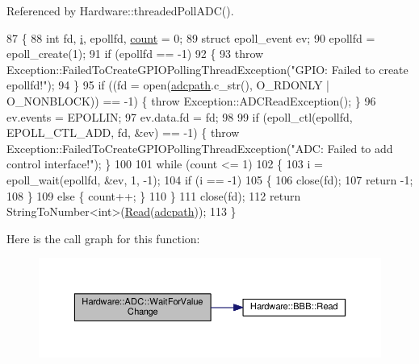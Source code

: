 Referenced by Hardware\+::threaded\+Poll\+A\+D\+C().


\begin{DoxyCode}
87     \{
88         \textcolor{keywordtype}{int} fd, \hyperlink{_comparision_pictures_2_createtest_image_8m_a6f6ccfcf58b31cb6412107d9d5281426}{i}, epollfd, \hyperlink{_comparision_pictures_2_createtest_image_8m_ae11b3deb3de3df7dc48e439074023e35}{count} = 0;
89         \textcolor{keyword}{struct }epoll\_event ev;
90         epollfd = epoll\_create(1);
91         \textcolor{keywordflow}{if} (epollfd == -1)
92         \{
93             \textcolor{keywordflow}{throw} Exception::FailedToCreateGPIOPollingThreadException(\textcolor{stringliteral}{"GPIO: Failed to create epollfd!"});
94         \}
95         \textcolor{keywordflow}{if} ((fd = open(\hyperlink{class_hardware_1_1_a_d_c_a820ce4f097a70b95246049f9ea01df21}{adcpath}.c\_str(), O\_RDONLY | O\_NONBLOCK)) == -1) \{ \textcolor{keywordflow}{throw} 
      Exception::ADCReadException();    \}
96         ev.events = EPOLLIN;
97         ev.data.fd = fd;
98 
99         \textcolor{keywordflow}{if} (epoll\_ctl(epollfd, EPOLL\_CTL\_ADD, fd, &ev) == -1) \{ \textcolor{keywordflow}{throw} 
      Exception::FailedToCreateGPIOPollingThreadException(\textcolor{stringliteral}{"ADC: Failed to add control interface!"}); \}
100 
101         \textcolor{keywordflow}{while} (count <= 1)
102         \{
103             i = epoll\_wait(epollfd, &ev, 1, -1);
104             \textcolor{keywordflow}{if} (i == -1)
105             \{
106                 close(fd);
107                 \textcolor{keywordflow}{return} -1;
108             \}
109             \textcolor{keywordflow}{else} \{ count++; \}
110         \}
111         close(fd);
112         \textcolor{keywordflow}{return} StringToNumber<int>(\hyperlink{class_hardware_1_1_b_b_b_a8b287ded7bcb2cfab361d1fca2b62e9f}{Read}(\hyperlink{class_hardware_1_1_a_d_c_a820ce4f097a70b95246049f9ea01df21}{adcpath}));
113     \}
\end{DoxyCode}


Here is the call graph for this function\+:\nopagebreak
\begin{figure}[H]
\begin{center}
\leavevmode
\includegraphics[width=350pt]{class_hardware_1_1_a_d_c_a7ae87fbf53ba93e33ea6eed41509a1f7_cgraph}
\end{center}
\end{figure}




